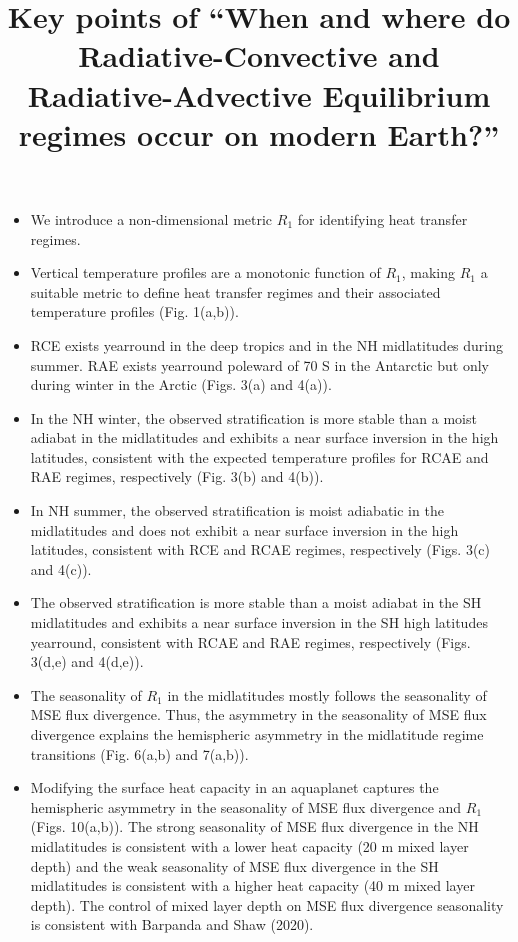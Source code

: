 \documentclass{article}
\title{Key points of ``When and where do Radiative-Convective and Radiative-Advective Equilibrium regimes occur on modern Earth?''}
\begin{document}
\maketitle

\begin{itemize}
  \item We introduce a non-dimensional metric $R_{1}$ for identifying heat transfer regimes.
\item Vertical temperature profiles are a monotonic function of $R_{1}$, making $R_{1}$ a suitable metric to define heat transfer regimes and their associated temperature profiles (Fig. 1(a,b)).
  \item RCE exists yearround in the deep tropics and in the NH midlatitudes during summer. RAE exists yearround poleward of 70 S in the Antarctic but only during winter in the Arctic (Figs. 3(a) and 4(a)).
  \item In the NH winter, the observed stratification is more stable than a moist adiabat in the midlatitudes and exhibits a near surface inversion in the high latitudes, consistent with the expected temperature profiles for RCAE and RAE regimes, respectively (Fig. 3(b) and 4(b)).
  \item In NH summer, the observed stratification is moist adiabatic in the midlatitudes and does not exhibit a near surface inversion in the high latitudes, consistent with RCE and RCAE regimes, respectively (Figs. 3(c) and 4(c)).
  \item The observed stratification is more stable than a moist adiabat in the SH midlatitudes and exhibits a near surface inversion in the SH high latitudes yearround, consistent with RCAE and RAE regimes, respectively (Figs. 3(d,e) and 4(d,e)).
  \item The seasonality of $R_{1}$ in the midlatitudes mostly follows the seasonality of MSE flux divergence. Thus, the asymmetry in the seasonality of MSE flux divergence explains the hemispheric asymmetry in the midlatitude regime transitions (Fig. 6(a,b) and 7(a,b)).
  \item Modifying the surface heat capacity in an aquaplanet captures the hemispheric asymmetry in the seasonality of MSE flux divergence and $R_{1}$ (Figs. 10(a,b)). The strong seasonality of MSE flux divergence in the NH midlatitudes is consistent with a lower heat capacity (20 m mixed layer depth) and the weak seasonality of MSE flux divergence in the SH midlatitudes is consistent with a higher heat capacity (40 m mixed layer depth). The control of mixed layer depth on MSE flux divergence seasonality is consistent with Barpanda and Shaw (2020).
\end{itemize}
\end{document}

